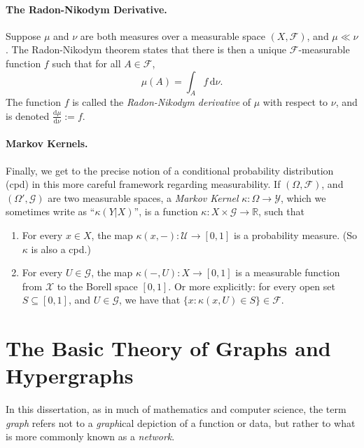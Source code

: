 \paragraph{The Radon-Nikodym Derivative.}
Suppose $\mu$ and $\nu$ are both measures over a measurable space $(X,\mathcal F)$, and $\mu \ll \nu$. 
The Radon-Nikodym theorem states that there is then a unique $\mathcal F$-measurable function $f$
such that for all $A \in \mathcal F$,
\[
    \mu(A) = \int_{A} f \,\mathrm d \nu.
\]
The function $f$ is called the \emph{Radon-Nikodym derivative} of $\mu$ with respect to $\nu$, and is denoted $\frac{\mathrm d\mu}{\mathrm d\nu} := f$.


\paragraph{Markov Kernels.}
Finally, we get to the precise notion of a conditional probability distribution (cpd) 
in this more careful framework regarding measurability.
If $(\Omega, \mathcal F)$, and $(\Omega', \mathcal G)$ are two measurable spaces, a \emph{Markov Kernel} $\kappa : \Omega \to \mathcal Y$, which we sometimes write as ``$\kappa(Y|X)$'', is a function $\kappa : X \times \mathcal G \to \mathbb R$, such that
\begin{enumerate}
    \item For every $x \in X$, the map $\kappa(x, -) : \mathcal U \to [0,1]$ is a probability measure. (So $\kappa$ is also a cpd.)
    \item For every $U \in \mathcal G$, the map $\kappa(-, U) : X \to [0,1]$ is a measurable function from $\mathcal X$ to the Borell space $[0,1]$.
    Or more explicitly: for every open set $S \subseteq [0,1]$, and $U \in \mathcal G$, we have that
    $\{x : \kappa(x,U) \in S\} \in \mathcal F$. 
\end{enumerate}


%

\section{The Basic Theory of Graphs and Hypergraphs}

In this dissertation, as in much of mathematics and computer science,
the term \emph{graph} refers not to a \emph{graph}ical depiction of a function or data,
but rather to what is more commonly known as a \emph{network}. 

